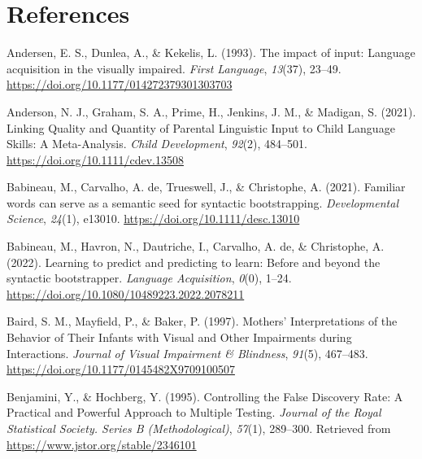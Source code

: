 \documentclass[
  man]{apa6}
\newlength{\cslhangindent}
\newlength{\cslentryspacingunit} %
\newenvironment{CSLReferences}[2] %
 {%
  \setlength{\parindent}{0pt}
  \ifodd #1
  \let\oldpar\par
  \def\par{\hangindent=\cslhangindent\oldpar}
  \fi
  \setlength{\parskip}{#2\cslentryspacingunit}
 }%
 {}
\begin{document}
\hypertarget{references}{%
\section*{References}\label{references}}

\hypertarget{refs}{}
\begin{CSLReferences}{1}{0}
\leavevmode{}%
Andersen, E. S., Dunlea, A., \& Kekelis, L. (1993). The impact of input: Language acquisition in the visually impaired. \emph{First Language}, \emph{13}(37), 23--49. \url{https://doi.org/10.1177/014272379301303703}

\leavevmode{}%
Anderson, N. J., Graham, S. A., Prime, H., Jenkins, J. M., \& Madigan, S. (2021). Linking {Quality} and {Quantity} of {Parental} {Linguistic} {Input} to {Child} {Language} {Skills}: {A} {Meta}-{Analysis}. \emph{Child Development}, \emph{92}(2), 484--501. \url{https://doi.org/10.1111/cdev.13508}

\leavevmode{}%
Babineau, M., Carvalho, A. de, Trueswell, J., \& Christophe, A. (2021). Familiar words can serve as a semantic seed for syntactic bootstrapping. \emph{Developmental Science}, \emph{24}(1), e13010. \url{https://doi.org/10.1111/desc.13010}

\leavevmode{}%
Babineau, M., Havron, N., Dautriche, I., Carvalho, A. de, \& Christophe, A. (2022). Learning to predict and predicting to learn: {Before} and beyond the syntactic bootstrapper. \emph{Language Acquisition}, \emph{0}(0), 1--24. \url{https://doi.org/10.1080/10489223.2022.2078211}

\leavevmode{}%
Baird, S. M., Mayfield, P., \& Baker, P. (1997). Mothers' {Interpretations} of the {Behavior} of {Their} {Infants} with {Visual} and {Other} {Impairments} during {Interactions}. \emph{Journal of Visual Impairment \& Blindness}, \emph{91}(5), 467--483. \url{https://doi.org/10.1177/0145482X9709100507}

\leavevmode{}%
Benjamini, Y., \& Hochberg, Y. (1995). Controlling the {False} {Discovery} {Rate}: {A} {Practical} and {Powerful} {Approach} to {Multiple} {Testing}. \emph{Journal of the Royal Statistical Society. Series B (Methodological)}, \emph{57}(1), 289--300. Retrieved from \url{https://www.jstor.org/stable/2346101}


\end{CSLReferences}
\end{document}
